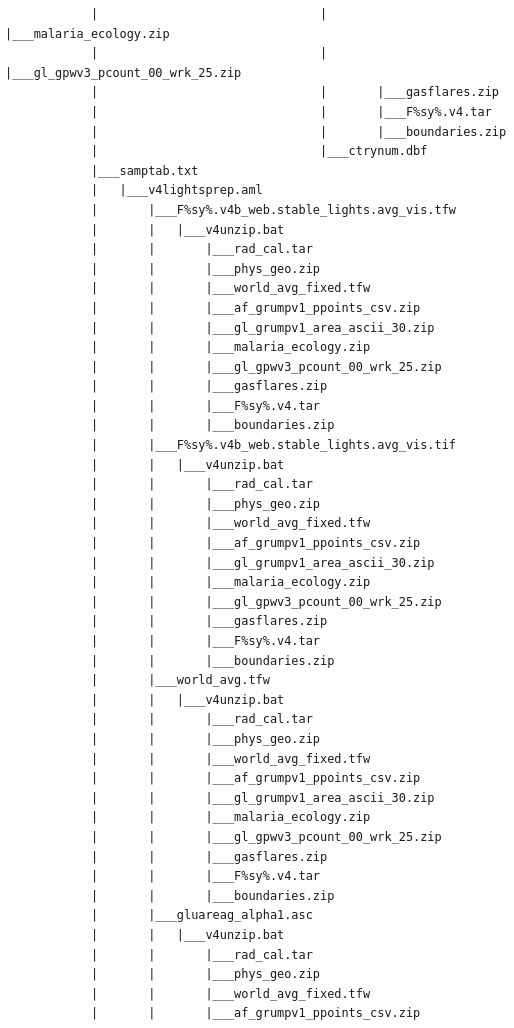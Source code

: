 \documentclass[
]{book}
\begin{document}
\begin{verbatim}
            |                               |       |___malaria_ecology.zip
            |                               |       |___gl_gpwv3_pcount_00_wrk_25.zip
            |                               |       |___gasflares.zip
            |                               |       |___F%sy%.v4.tar
            |                               |       |___boundaries.zip
            |                               |___ctrynum.dbf
            |___samptab.txt
            |   |___v4lightsprep.aml
            |       |___F%sy%.v4b_web.stable_lights.avg_vis.tfw
            |       |   |___v4unzip.bat
            |       |       |___rad_cal.tar
            |       |       |___phys_geo.zip
            |       |       |___world_avg_fixed.tfw
            |       |       |___af_grumpv1_ppoints_csv.zip
            |       |       |___gl_grumpv1_area_ascii_30.zip
            |       |       |___malaria_ecology.zip
            |       |       |___gl_gpwv3_pcount_00_wrk_25.zip
            |       |       |___gasflares.zip
            |       |       |___F%sy%.v4.tar
            |       |       |___boundaries.zip
            |       |___F%sy%.v4b_web.stable_lights.avg_vis.tif
            |       |   |___v4unzip.bat
            |       |       |___rad_cal.tar
            |       |       |___phys_geo.zip
            |       |       |___world_avg_fixed.tfw
            |       |       |___af_grumpv1_ppoints_csv.zip
            |       |       |___gl_grumpv1_area_ascii_30.zip
            |       |       |___malaria_ecology.zip
            |       |       |___gl_gpwv3_pcount_00_wrk_25.zip
            |       |       |___gasflares.zip
            |       |       |___F%sy%.v4.tar
            |       |       |___boundaries.zip
            |       |___world_avg.tfw
            |       |   |___v4unzip.bat
            |       |       |___rad_cal.tar
            |       |       |___phys_geo.zip
            |       |       |___world_avg_fixed.tfw
            |       |       |___af_grumpv1_ppoints_csv.zip
            |       |       |___gl_grumpv1_area_ascii_30.zip
            |       |       |___malaria_ecology.zip
            |       |       |___gl_gpwv3_pcount_00_wrk_25.zip
            |       |       |___gasflares.zip
            |       |       |___F%sy%.v4.tar
            |       |       |___boundaries.zip
            |       |___gluareag_alpha1.asc
            |       |   |___v4unzip.bat
            |       |       |___rad_cal.tar
            |       |       |___phys_geo.zip
            |       |       |___world_avg_fixed.tfw
            |       |       |___af_grumpv1_ppoints_csv.zip

\end{verbatim}
\end{document}
